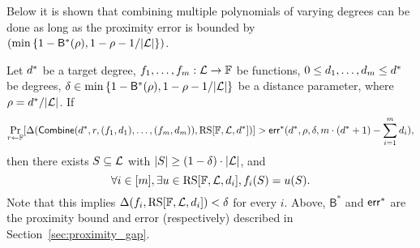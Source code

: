 Below it is shown that combining multiple polynomials of varying degrees can be done as long as the proximity error is bounded by $(\min{\{1-{\mathsf{B}}^*(\rho),1-\rho-1/|\mathcal{L}|\}})$.

\begin{lemma}\label{lemma:combine}
{}
    Let $d^*$ be a target degree, $f_1,\ldots,f_m:\mathcal{L}\rightarrow\mathbb{F}$ be functions, $0\leq d_1,\ldots,d_m\leq d^*$ be degrees, $\delta\in\min{\{1-{\mathsf{B}}^*(\rho),1-\rho-1/|\mathcal{L}|\}}$ be a distance parameter, where $\rho=d^*/|\mathcal{L}|$. If
    \[
        \Pr_{r\gets\mathbb{F}}[\Delta(\mathsf{Combine}(d^*,r,(f_1,d_1),\ldots,(f_m,d_m)),\mathrm{RS}[\mathbb{F},\mathcal{L},d^*])]>\mathsf{err}^*(d^*,\rho,\delta,m\cdot(d^*+1)-\sum_{i=1}^{m}d_i),
    \] 
    then there exists $S\subseteq \mathcal{L}$ with $|S|\geq(1-\delta)\cdot|\mathcal{L}|$, and
    \[
        \forall i\in[m],\exists u\in\mathrm{RS}[\mathbb{F},\mathcal{L},d_i], f_i(S)=u(S).
    \]
    Note that this implies $\Delta(f_i,\mathrm{RS}[\mathbb{F},\mathcal{L},d_i])<\delta$ for every $i$. Above, ${\mathsf{B}}^*$ and ${\mathsf{err}}^*$ are the proximity bound and error (respectively) described in Section~\ref{sec:proximity_gap}.
\end{lemma}